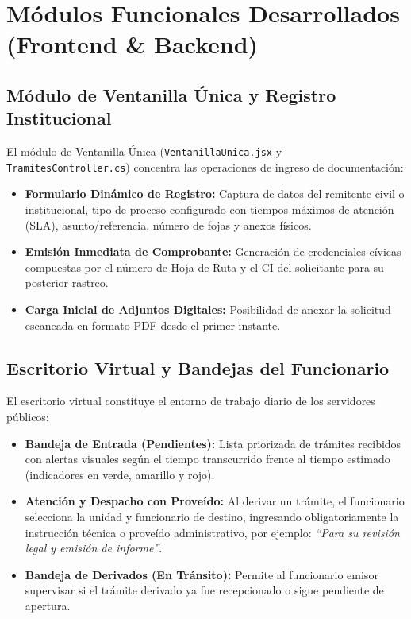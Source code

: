 \documentclass[a4paper,12pt]{article}
\begin{document}
\section{Módulos Funcionales Desarrollados (Frontend \& Backend)}

\subsection{Módulo de Ventanilla Única y Registro Institucional}
El módulo de Ventanilla Única (\texttt{VentanillaUnica.jsx} y \texttt{TramitesController.cs}) concentra las operaciones de ingreso de documentación:
\begin{itemize}[leftmargin=1.5em]
    \item \textbf{Formulario Dinámico de Registro:} Captura de datos del remitente civil o institucional, tipo de proceso configurado con tiempos máximos de atención (SLA), asunto/referencia, número de fojas y anexos físicos.
    \item \textbf{Emisión Inmediata de Comprobante:} Generación de credenciales cívicas compuestas por el número de Hoja de Ruta y el CI del solicitante para su posterior rastreo.
    \item \textbf{Carga Inicial de Adjuntos Digitales:} Posibilidad de anexar la solicitud escaneada en formato PDF desde el primer instante.
\end{itemize}

\subsection{Escritorio Virtual y Bandejas del Funcionario}
El escritorio virtual constituye el entorno de trabajo diario de los servidores públicos:
\begin{itemize}[leftmargin=1.5em]
    \item \textbf{Bandeja de Entrada (Pendientes):} Lista priorizada de trámites recibidos con alertas visuales según el tiempo transcurrido frente al tiempo estimado (indicadores en verde, amarillo y rojo).
    \item \textbf{Atención y Despacho con Proveído:} Al derivar un trámite, el funcionario selecciona la unidad y funcionario de destino, ingresando obligatoriamente la instrucción técnica o proveído administrativo, por ejemplo: \emph{``Para su revisión legal y emisión de informe''}.
    \item \textbf{Bandeja de Derivados (En Tránsito):} Permite al funcionario emisor supervisar si el trámite derivado ya fue recepcionado o sigue pendiente de apertura.
\end{itemize}
\end{document}
